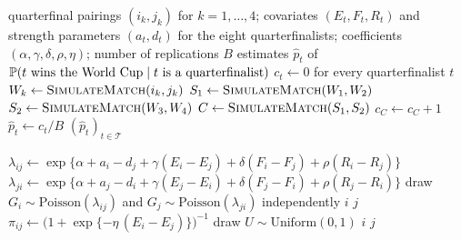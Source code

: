 
\begin{algorithm}[htbp]
\caption{Monte Carlo estimation of conditional championship probabilities}
\label{alg:tournament}
\begin{algorithmic}[1]
\Require quarterfinal pairings $(i_k, j_k)$ for $k = 1, \dots, 4$;
         covariates $(E_t, F_t, R_t)$ and strength parameters $(a_t, d_t)$
         for the eight quarterfinalists;
         coefficients $(\alpha, \gamma, \delta, \rho, \eta)$;
         number of replications $B$
\Ensure  estimates $\hat{p}_t$ of
         $\mathbb{P}(t \text{ wins the World Cup} \mid t \text{ is a quarterfinalist})$
\State $c_t \gets 0$ for every quarterfinalist $t$
        \State $W_k \gets \Call{SimulateMatch}{i_k, j_k}$
    \EndFor
    \State $S_1 \gets \Call{SimulateMatch}{W_1, W_2}$
    \State $S_2 \gets \Call{SimulateMatch}{W_3, W_4}$
    \State $C \gets \Call{SimulateMatch}{S_1, S_2}$
    \State $c_C \gets c_C + 1$
\EndFor
{}
    \State $\hat{p}_t \gets c_t / B$
\EndFor
\State \Return $(\hat{p}_t)_{t \in \mathcal{T}}$
\end{algorithmic}
\end{algorithm}

\begin{algorithm}[htbp]
\caption{The \textsc{SimulateMatch} subroutine: one knockout match}
\label{alg:match}
\begin{algorithmic}[1]
    \State $\lambda_{ij} \gets \exp\bigl\{\alpha + a_i - d_j
           + \gamma (E_i - E_j) + \delta (F_i - F_j)
           + \rho (R_i - R_j)\bigr\}$
    \State $\lambda_{ji} \gets \exp\bigl\{\alpha + a_j - d_i
           + \gamma (E_j - E_i) + \delta (F_j - F_i)
           + \rho (R_j - R_i)\bigr\}$
    \State draw $G_i \sim \mathrm{Poisson}(\lambda_{ij})$ and
           $G_j \sim \mathrm{Poisson}(\lambda_{ji})$ independently
        \State \Return $i$ 
        \State \Return $j$
    \Else
        \State $\pi_{ij} \gets
               \bigl(1 + \exp\{-\eta\,(E_i - E_j)\}\bigr)^{-1}$
        \State draw $U \sim \mathrm{Uniform}(0, 1)$
            \State \Return $i$
        \Else
            \State \Return $j$
        \EndIf
    \EndIf
\EndFunction
\end{algorithmic}
\end{algorithm}
